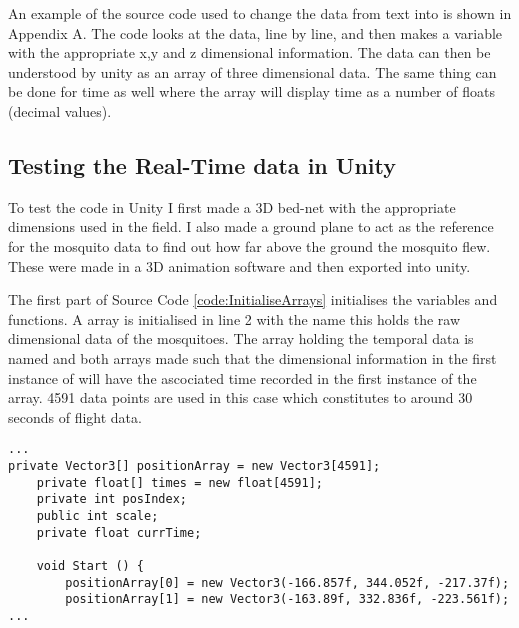An example of the source code used to change the data from text into  is shown in Appendix A. The code looks at the data, line by line, and then makes a  variable with the appropriate x,y and z dimensional information. The data can then be understood by unity as an array of three dimensional data. The same thing can be done for time as well where the array will display time as a number of floats (decimal values).

\subsection{Testing the Real-Time data in Unity }

To test the code in Unity I first made a 3D bed-net with the appropriate dimensions used in the field. I also made a ground plane to act as the reference for the mosquito data to find out how far above the ground the mosquito flew. These were made in a 3D animation software and then exported into unity. 


The first part of Source Code \ref{code:InitialiseArrays} initialises the variables and functions. A  array is initialised in line 2 with the name  this holds the raw dimensional data of the mosquitoes. The array holding the temporal data is named  and both arrays made such that the dimensional information in the first instance of  will have the ascociated time recorded in the first instance of the  array. 4591 data points are used in this case which constitutes to around 30 seconds of flight data.

\bigskip
\begin{code1}
\begin{verbatim}
...
private Vector3[] positionArray = new Vector3[4591];
	private float[] times = new float[4591];
	private int posIndex;
	public int scale;
	private float currTime;

	void Start () {
		positionArray[0] = new Vector3(-166.857f, 344.052f, -217.37f);
		positionArray[1] = new Vector3(-163.89f, 332.836f, -223.561f);
...
\end{verbatim}

\label{code:InitialiseArrays}
\end{code1}

